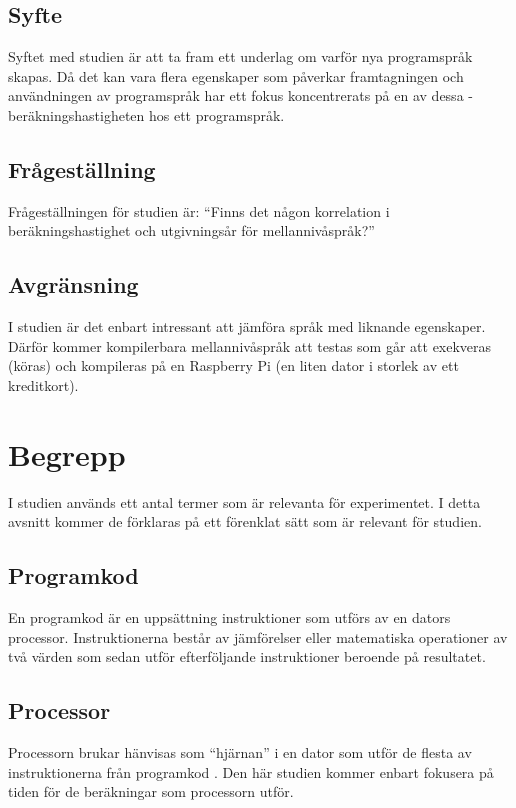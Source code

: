 \documentclass[12pt,swedish]{article}
\begin{document}
\subsection{Syfte}
Syftet med studien är att ta fram ett underlag om varför nya programspråk skapas. Då det kan vara flera egenskaper som påverkar framtagningen och användningen av programspråk har ett fokus koncentrerats på en av dessa - beräkningshastigheten hos ett programspråk.

\subsection{Frågeställning}
Frågeställningen för studien är: “Finns det någon korrelation i beräkningshastighet och utgivningsår för mellannivåspråk?”

\subsection{Avgränsning}
I studien är det enbart intressant att jämföra språk med liknande egenskaper. Därför kommer kompilerbara mellannivåspråk att testas som går att exekveras (köras) och kompileras på en Raspberry Pi (en liten dator i storlek av ett kreditkort).


\section{Begrepp}
I studien används ett antal termer som är relevanta för experimentet. I detta avsnitt kommer de förklaras på ett förenklat sätt som är relevant för studien.

\subsection{Programkod}
En programkod är en uppsättning instruktioner som utförs av en dators processor. Instruktionerna består av jämförelser eller matematiska operationer av två värden som sedan utför efterföljande instruktioner beroende på resultatet.

\subsection{Processor}
Processorn brukar hänvisas som “hjärnan” i en dator som utför de flesta av instruktionerna från programkod \citep{charuba_1996}. Den här studien kommer enbart fokusera på tiden för de beräkningar som processorn utför.
\end{document}
